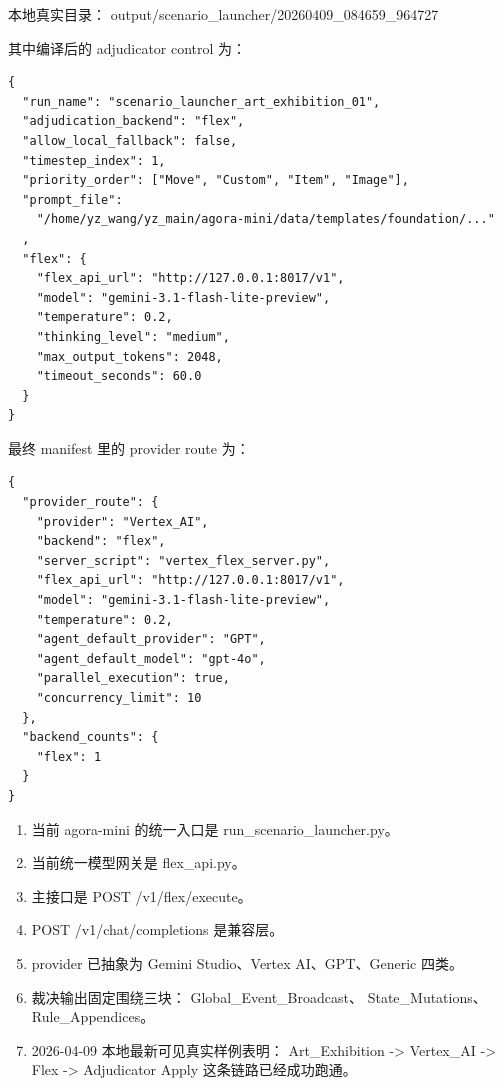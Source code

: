 \documentclass[11pt,a4paper]{article}
\newcommand{\sect}[1]{\vspace{8pt}{\sectionfont #1}\par}
\newcommand{\code}[1]{{\smallmono #1}}
\begin{document}
\sect{5. 当前真实运行样例}
本地真实目录：
\code{output/scenario\_launcher/20260409\_084659\_964727}

其中编译后的 adjudicator control 为：

\begin{verbatim}
{
  "run_name": "scenario_launcher_art_exhibition_01",
  "adjudication_backend": "flex",
  "allow_local_fallback": false,
  "timestep_index": 1,
  "priority_order": ["Move", "Custom", "Item", "Image"],
  "prompt_file":
    "/home/yz_wang/yz_main/agora-mini/data/templates/foundation/..."
  ,
  "flex": {
    "flex_api_url": "http://127.0.0.1:8017/v1",
    "model": "gemini-3.1-flash-lite-preview",
    "temperature": 0.2,
    "thinking_level": "medium",
    "max_output_tokens": 2048,
    "timeout_seconds": 60.0
  }
}
\end{verbatim}

最终 manifest 里的 provider route 为：

\begin{verbatim}
{
  "provider_route": {
    "provider": "Vertex_AI",
    "backend": "flex",
    "server_script": "vertex_flex_server.py",
    "flex_api_url": "http://127.0.0.1:8017/v1",
    "model": "gemini-3.1-flash-lite-preview",
    "temperature": 0.2,
    "agent_default_provider": "GPT",
    "agent_default_model": "gpt-4o",
    "parallel_execution": true,
    "concurrency_limit": 10
  },
  "backend_counts": {
    "flex": 1
  }
}
\end{verbatim}

\sect{6. 关键结论}

\begin{enumerate}
\item 当前 agora-mini 的统一入口是 \code{run\_scenario\_launcher.py}。
\item 当前统一模型网关是 \code{flex\_api.py}。
\item 主接口是 \code{POST /v1/flex/execute}。
\item \code{POST /v1/chat/completions} 是兼容层。
\item provider 已抽象为 Gemini Studio、Vertex AI、GPT、Generic 四类。
\item 裁决输出固定围绕三块：
\code{Global\_Event\_Broadcast}、
\code{State\_Mutations}、
\code{Rule\_Appendices}。
\item 2026-04-09 本地最新可见真实样例表明：
\code{Art\_Exhibition -> Vertex\_AI -> Flex -> Adjudicator Apply}
这条链路已经成功跑通。
\end{enumerate}
\end{document}

